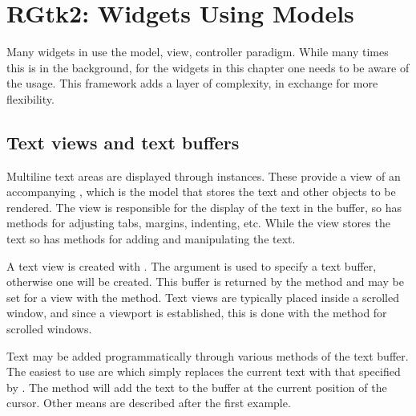 \chapter{RGtk2: Widgets Using Models}
\label{sec:RGtk2:widgets-with-models}

Many widgets in \GTK\/ use the model, view, controller paradigm. While
many times this is in the background, for the widgets in this chapter
one needs to be aware of the usage. This framework adds a layer of
complexity, in exchange for more flexibility.  



\section{Text views and text buffers} %
\label{sec:RGtk2:textviews}

Multiline text areas are displayed through  
instances. These provide a view of an accompanying
, which is the model that stores the text and
other objects to be rendered. The view is responsible for the display
of the text in the buffer, so has methods for adjusting tabs, margins,
indenting, etc. While the view stores the text so has methods for
adding and manipulating the text.

A text view is created with . The
 argument is used to specify a text
buffer, otherwise one will be created. 
This buffer is returned by the
method  and may be set for a view with
the  method. Text views are typically
placed inside a scrolled window, and since a viewport is established,
this is done with the  method for scrolled
windows.


Text may be added programmatically through various 
methods of the text buffer. The easiest to use are  which
simply replaces the current text with that specified by
. The method
 will add the text to the buffer
at the current position of the cursor. Other means are described after
the first example.

